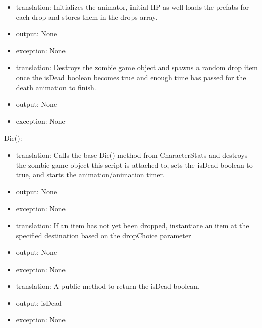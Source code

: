\documentclass[12pt]{article}
\begin{document}
\begin{itemize}
\item {\color{magenta} translation: Initializes the animator, initial HP as well loads the prefabs for each drop and stores them in the drops array.}
\item {\color{magenta}output: None }
\item {\color{magenta} exception: None}
\end{itemize}

\begin{itemize}
\item {\color{magenta}translation: Destroys the zombie game object and spawns a random drop item once the isDead boolean becomes true and enough time has passed for the death animation to finish. }
\item {\color{magenta} output: None}
\item {\color{magenta} exception: None}
\end{itemize}

\noindent Die():
\begin{itemize}
\item translation: Calls the base Die() method from CharacterStats \sout{and destroys the zombie game object this script is attached to}{\color{magenta}, sets the isDead boolean to true, and starts the animation/animation timer.}
\item output: None
\item exception: None
\end{itemize}

\begin{itemize}
\item {\color{magenta} translation: If an item has not yet been dropped, instantiate an item at the specified destination based on the dropChoice parameter}
\item {\color{magenta} output: None}
\item {\color{magenta} exception: None}
\end{itemize}

\begin{itemize}
\item {\color{magenta} translation: A public method to return the isDead boolean. }
\item {\color{magenta} output: isDead}
\item {\color{magenta} exception: None}
\end{itemize}
\end{document}
